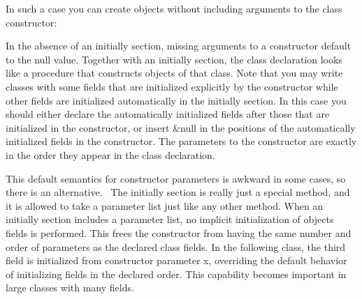 
\noindent
In such a case you can create objects without including arguments to the
class constructor: 


In the absence of an \textsf{initially} section, missing arguments to a
constructor default to the null value. Together with an
\textsf{initially} section, the class declaration looks like a
procedure that constructs objects of that class. Note that you may
write classes with some fields that are initialized explicitly by the
constructor while other fields are initialized automatically in the
\textsf{initially} section. In this case you should either declare the
automatically initialized fields after those that are initialized in
the constructor, or insert \textsf{\&null} in the positions of the
automatically initialized fields in the constructor. The parameters to
the constructor are exactly in the order they appear in the class
declaration.

This default semantics for constructor parameters is awkward in some
cases, so there is an alternative. \ The \textsf{initially} section is
really just a special method, and it is allowed to take a parameter
list just like any other method. When an initially section includes a
parameter list, no implicit initialization of objects{\textquotesingle}
fields is performed. This frees the constructor from having the same
number and order of parameters as the declared class fields. In the
following class, the third field is initialized from constructor
parameter \textsf{x}, overriding the default behavior of initializing
fields in the declared order. This capability becomes important in
large classes with many fields.


